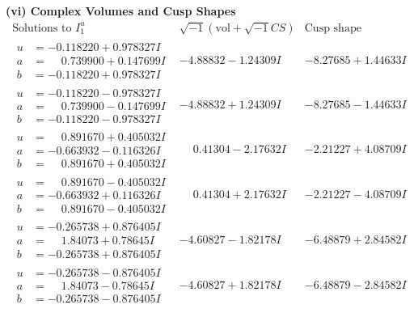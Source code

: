 \documentclass[1p]{elsarticle_modified}
\theoremstyle{definition}
\newcommand{\I}{\sqrt{-1}}
\begin{document}
\newpage\flushleft \textbf{(vi) Complex Volumes and Cusp Shapes}
$$\begin{array}{c|c|c}  
\text{Solutions to }I^u_{1}& \I (\text{vol} + \sqrt{-1}CS) & \text{Cusp shape}\\
 \hline 
\begin{aligned}
u &= -0.118220 + 0.978327 I \\
a &= \phantom{-}0.739900 + 0.147699 I \\
b &= -0.118220 + 0.978327 I\end{aligned}
 & -4.88832 - 1.24309 I & -8.27685 + 1.44633 I \\ \hline\begin{aligned}
u &= -0.118220 - 0.978327 I \\
a &= \phantom{-}0.739900 - 0.147699 I \\
b &= -0.118220 - 0.978327 I\end{aligned}
 & -4.88832 + 1.24309 I & -8.27685 - 1.44633 I \\ \hline\begin{aligned}
u &= \phantom{-}0.891670 + 0.405032 I \\
a &= -0.663932 - 0.116326 I \\
b &= \phantom{-}0.891670 + 0.405032 I\end{aligned}
 & \phantom{-}0.41304 - 2.17632 I & -2.21227 + 4.08709 I \\ \hline\begin{aligned}
u &= \phantom{-}0.891670 - 0.405032 I \\
a &= -0.663932 + 0.116326 I \\
b &= \phantom{-}0.891670 - 0.405032 I\end{aligned}
 & \phantom{-}0.41304 + 2.17632 I & -2.21227 - 4.08709 I \\ \hline\begin{aligned}
u &= -0.265738 + 0.876405 I \\
a &= \phantom{-}1.84073 + 0.78645 I \\
b &= -0.265738 + 0.876405 I\end{aligned}
 & -4.60827 - 1.82178 I & -6.48879 + 2.84582 I \\ \hline\begin{aligned}
u &= -0.265738 - 0.876405 I \\
a &= \phantom{-}1.84073 - 0.78645 I \\
b &= -0.265738 - 0.876405 I\end{aligned}
 & -4.60827 + 1.82178 I & -6.48879 - 2.84582 I \\ \hline\begin{aligned}

\end{aligned}
\end{array}$$
\end{document}
